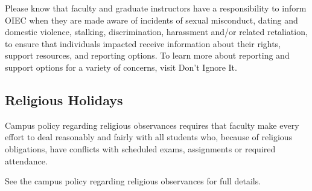 \documentclass[11pt, a4paper]{article}
\begin{document}
Please know that faculty and graduate instructors have a responsibility to inform OIEC when they are made aware of incidents of sexual misconduct, dating and domestic violence, stalking, discrimination, harassment and/or related retaliation, to ensure that individuals impacted receive information about their rights, support resources, and reporting options. To learn more about reporting and support options for a variety of concerns, visit Don’t Ignore It.

\subsection*{Religious Holidays}

Campus policy regarding religious observances requires that faculty make every effort to deal reasonably and fairly with all students who, because of religious obligations, have conflicts with scheduled exams, assignments or required attendance.

See the campus policy regarding religious observances for full details.

\end{document}
